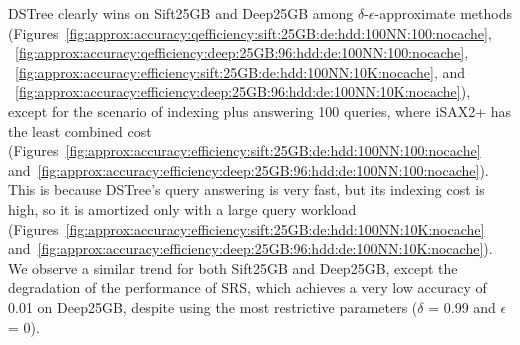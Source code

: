 {{DSTree clearly wins on Sift25GB and Deep25GB among $\delta$-$\epsilon$-approximate methods (Figures~\ref{fig:approx:accuracy:qefficiency:sift:25GB:de:hdd:100NN:100:nocache}, ~\ref{fig:approx:accuracy:qefficiency:deep:25GB:96:hdd:de:100NN:100:nocache}, ~\ref{fig:approx:accuracy:efficiency:sift:25GB:de:hdd:100NN:10K:nocache}, and ~\ref{fig:approx:accuracy:efficiency:deep:25GB:96:hdd:de:100NN:10K:nocache}), except for the scenario of indexing plus answering 100 queries, where iSAX2+ has the least combined cost (Figures~\ref{fig:approx:accuracy:efficiency:sift:25GB:de:hdd:100NN:100:nocache} and~\ref{fig:approx:accuracy:efficiency:deep:25GB:96:hdd:de:100NN:100:nocache}). 
This is because DSTree's query answering is very fast, but its indexing cost is high, so it is amortized only with a large query workload (Figures~\ref{fig:approx:accuracy:efficiency:sift:25GB:de:hdd:100NN:10K:nocache} and~\ref{fig:approx:accuracy:efficiency:deep:25GB:96:hdd:de:100NN:10K:nocache}). 
We observe a similar trend for both Sift25GB and Deep25GB, except the degradation of the performance of SRS, which achieves a very low accuracy of 0.01 on Deep25GB, despite using the most restrictive parameters ($\delta$ = 0.99 and $\epsilon$ = 0). 
\begin{comment}
\begin{figure*}[!htb]
	\captionsetup{justification=centering}
	\captionsetup[subfigure]{justification=centering}
	\begin{subfigure}{\textwidth}
		\centering
		\texttt{[image: \{full\_epsilon\_legend\_new]}}\\
	\end{subfigure}	
	\begin{subfigure}{0.16\textwidth}
		\centering
		\texttt{[image: exact\_mapk\_throughput\_sift\_25GB\_128\_ng\_100NN\_100\_nocache]}
		\caption{100-NN (ng)} 
		\label{fig:approx:accuracy:qefficiency:sift:25GB:ng:hdd:100NN:100:nocache}
	\end{subfigure}
	\begin{subfigure}{0.16\textwidth}
		\centering
		\texttt{[image: exact\_mapk\_throughput\_sift\_25GB\_128\_de\_100NN\_100\_nocache]}
		\caption{100-NN ($\bm{\delta\epsilon}$)} 
		\label{fig:approx:accuracy:qefficiency:sift:25GB:de:hdd:100NN:100:nocache}
	\end{subfigure}
	\begin{subfigure}{0.16\textwidth}
		\centering
		\texttt{[image: exact\_mapk\_idxproc\_sift\_25GB\_128\_ng\_100NN\_100\_nocache]}

\end{comment}}}
